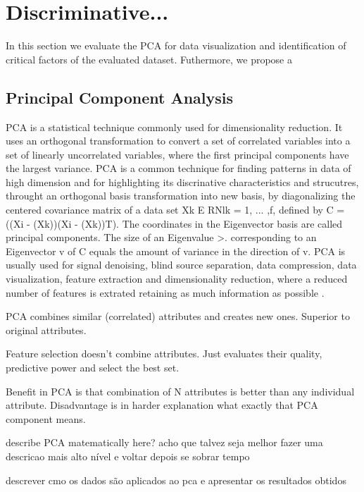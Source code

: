 \section{Discriminative...}
\label{sec:prop_getv}

In this section we evaluate the PCA for data visualization and identification of critical factors of the evaluated dataset. Futhermore, we propose a 

\subsection{Principal Component Analysis}

PCA is a statistical technique commonly used for dimensionality reduction. It uses an orthogonal transformation to convert a set of correlated variables into a set of linearly uncorrelated variables, where the first principal components have the largest variance. PCA is a common technique for finding patterns in data of high dimension and for highlighting its discrinative characteristics and strucutres, throught an orthogonal basis transformation into new basis, by diagonalizing the centered covariance matrix of a data set {Xk E RNlk = 1, ... ,f}, defined by C = ((Xi - (Xk))(Xi - (Xk))T). The coordinates in the Eigenvector basis are called principal components. The size of an Eigenvalue >. corresponding to an Eigenvector v of C equals the amount of variance in the direction of v. PCA is usually used for signal denoising, blind source separation, data compression, data visualization, feature extraction and dimensionality reduction, where a reduced number of features is extrated retaining as much information as possible \cite{jolliffe1986principal}.

PCA combines similar (correlated) attributes and creates new ones. Superior to original attributes. 

Feature selection doesn't combine attributes. Just evaluates their quality, predictive power and select the best set. 

Benefit in PCA is that combination of N attributes is better than any individual attribute. Disadvantage is in harder explanation what exactly that PCA component means.

describe PCA matematically here? acho que talvez seja melhor fazer uma descricao mais alto nível e voltar depois se sobrar tempo

descrever cmo os dados são aplicados ao pca e apresentar os resultados obtidos


